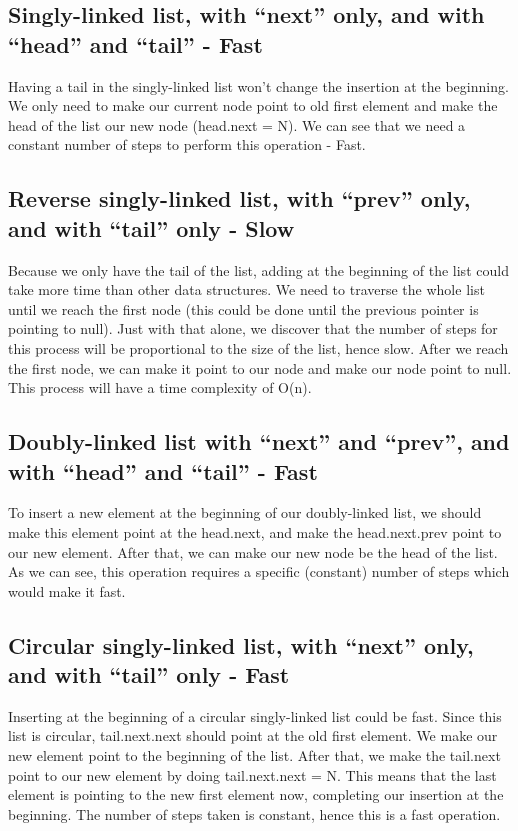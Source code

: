\documentclass{article}
\begin{document}
\subsection{Singly-linked list, with “next” only, and with “head” and “tail” - Fast}
Having a tail in the singly-linked list won't change the insertion at the beginning. We only need to make our current node point to old first element and make the head of the list our new node (head.next = N). We can see that we need a constant number of steps to perform this operation - Fast.

\subsection{Reverse singly-linked list, with “prev” only, and with “tail” only - Slow}
Because we only have the tail of the list, adding at the beginning of the list could take more time than other data structures. We need to traverse the whole list until we reach the first node (this could be done until the previous pointer is pointing to null). Just with that alone, we discover that the number of steps for this process will be proportional to the size of the list, hence slow. After we reach the first node, we can make it point to our node and make our node point to null. This process will have a time complexity of O(n).  

\subsection{Doubly-linked list with “next” and “prev”, and with “head” and “tail” - Fast}
To insert a new element at the beginning of our doubly-linked list, we should make this element point at the head.next, and make the head.next.prev point to our new element. After that, we can make our new node be the head of the list. As we can see, this operation requires a specific (constant) number of steps which would make it fast.

\subsection{Circular singly-linked list, with “next” only, and with “tail” only - Fast}
Inserting at the beginning of a circular singly-linked list could be fast. Since this list is circular, tail.next.next should point at the old first element. We make our new element point to the beginning of the list. After that, we make the tail.next point to our new element by doing tail.next.next = N. This means that the last element is pointing to the new first element now, completing our insertion at the beginning. The number of steps taken is constant, hence this is a fast operation.
\end{document}
